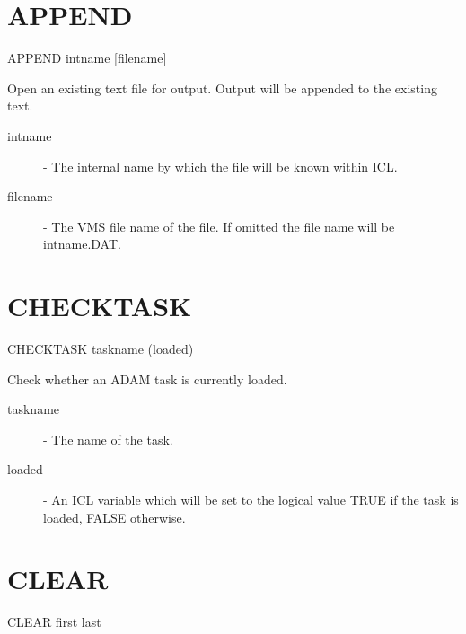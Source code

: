 \section{APPEND}
                                       
   APPEND \hspace{.5cm} intname \hspace{.5cm} [filename]

 Open an existing text file for output. Output will be appended to the
 existing text.

\begin{description}

\item[intname]  -  The internal name by which the file will be known
                  within ICL.

\item[filename]  -  The VMS file name of the file. If omitted the
                  file name will be intname.DAT.

\end{description}



\section{CHECKTASK}
                                       
   CHECKTASK \hspace{.5cm} taskname \hspace{.5cm} (loaded)

 Check whether an ADAM task is currently loaded.

\begin{description}

\item[taskname]  -  The name of the task.

\item[loaded]  -  An ICL variable which will be set to the logical value
                  TRUE if the task is loaded, FALSE otherwise.

\end{description}

\section{CLEAR}

   CLEAR \hspace{.5cm} first \hspace{.5cm} last

